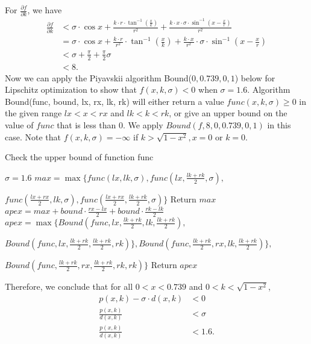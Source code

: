 For $\frac{\partial f}{\partial k}  $, we have 
\begin{align*}
    \frac{\partial f}{\partial k}  
    & <  \sigma\cdot\cos x + \frac{k\cdot r\cdot \tan^{-1}(\frac{x}{k}) }{r^2} + \frac{k\cdot x\cdot\sigma\cdot \sin^{-1}(x-\frac{x}{r})}{r^2}\\
    & =  \sigma\cdot\cos x + \frac{k\cdot r}{r^2}\cdot \tan^{-1}(\frac{x}{k})  + \frac{k\cdot x}{r^2}\cdot\sigma\cdot \sin^{-1}(x-\frac{x}{r})\\
    & <  \sigma + \frac{\pi}{2} + \frac{\pi}{2}\sigma \\
    & < 8.
\end{align*}
Now we can apply  the Piyavskii algorithm Bound($0, 0.739, 0, 1$) below for Lipschitz optimization to show that $f(x, k, \sigma)<0$ when $\sigma = 1.6$. Algorithm Bound(func, bound, lx, rx, lk, rk) will either return a value $func(x, k, \sigma) \ge 0$ in the given range $lx < x < rx$ and $lk < k < rk$, or give an upper bound on the value of $func$ that is less than 0. We apply $Bound(f, 8, 0, 0.739, 0, 1)$ in this case. Note that $f(x, k, \sigma) = -\infty$ if $k>\sqrt{1-x^2}, x = 0$ or $k = 0.$

\begin{algorithm}
\caption{Check the upper bound of function func}
\label{array-sum}
\begin{algorithmic}[1]
\State $\sigma = 1.6$
\State $max =\max \{func(lx, lk, \sigma), func(lx, \frac{lk + rk}{2}, \sigma), $

\qquad$func(\frac{lx+rx}{2}, lk, \sigma), func(\frac{lx+rx}{2}, \frac{lk + rk}{2}, \sigma)\}$
\State Return $max$
\EndIf
    \State $apex = max + bound\cdot\frac{rx-lx}{2}+bound\cdot\frac{rk-lk}{2}$
\State $apex = \max\{Bound(func, lx, \frac{lk + rk}{2}, lk, \frac{lk + rk}{2}), $

$Bound(func, lx, \frac{lk + rk}{2}, \frac{lk + rk}{2}, rk)\}, 
Bound(func, \frac{lk + rk}{2}, rx, lk, \frac{lk + rk}{2})\},$

$Bound(func, \frac{lk + rk}{2}, rx, \frac{lk + rk}{2}, rk, rk)\}$
\EndIf
	\State Return $apex$
\EndProcedure
\end{algorithmic}
\end{algorithm}
Therefore, we conclude that for all $0<x<0.739$ and $0<k<\sqrt{1-x^2}$,
\begin{align*}
  p(x, k) - \sigma\cdot d(x, k) & < 0\\
  \frac{p(x, k)}{d(x, k)} & < \sigma \\ 
  \frac{p(x, k)}{d(x, k)} & < 1.6.
\end{align*}

